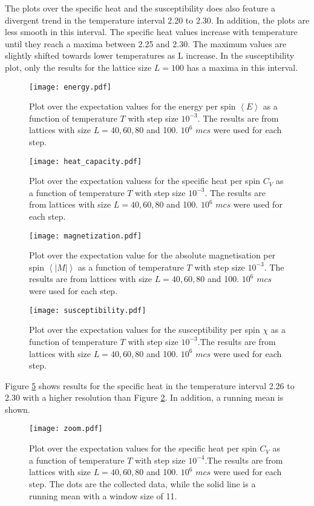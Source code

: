 The plots over the specific heat and the susceptibility does also feature a divergent trend in the temperature interval 2.20 to 2.30. In addition, the plots are less smooth in this interval. The specific heat values increase with temperature until they reach a maxima between 2.25 and 2.30. The maximum values are slightly shifted towards lower temperatures as L increase. In the susceptibility plot, only the results for the lattice size $L=100$ has a maxima in this interval.  
\begin{figure}[htbp]
	\centering
	\texttt{[image: energy.pdf]}
	\caption{Plot over the expectation values for the energy per spin $\left\langle E\right\rangle$ as a function of temperature $T$ with step size $10^{-3}$. The results are from lattices with size $L=40,60,80$ and 100.  $10^6$ $mcs$ were used for each step.}
	\label{fig:E}
\end{figure}

\begin{figure}[htbp]
	\centering
	\texttt{[image: heat\_capacity.pdf]}
	\caption{Plot over the expectation valuess for the specific heat per spin $C_V$ as a function of temperature $T$ with step size $10^{-3}$. The results are from lattices with size $L=40,60,80$ and 100. $10^6$ $mcs$ were used for each step.}
	\label{fig:C}
\end{figure}

\begin{figure}[htbp]
	\centering
	\texttt{[image: magnetization.pdf]}
	\caption{Plot over the expectation value for the absolute magnetisation per spin $\left\langle |M|\right\rangle$ as a function of temperature $T$ with step size $10^{-3}$. The results are from lattices with size $L=40,60,80$ and 100. $10^6$ $mcs$ were used for each step.}
	\label{fig:M}
\end{figure}

\begin{figure}[htbp]
	\centering
	\texttt{[image: susceptibility.pdf]}
	\caption{Plot over the expectation values for the susceptibility per spin $\chi$ as a function of temperature $T$ with step size $10^{-3}$.The results are from lattices with size $L=40,60,80$ and 100. $10^6$ $mcs$ were used for each step.}
	\label{fig:Chi}
\end{figure}

Figure \ref{fig:zoom} shows results for the specific heat in the temperature interval 2.26 to 2.30 with a higher resolution than Figure \ref{fig:C}. In addition, a running mean is shown.  
\begin{figure}[htbp]
	\centering
	\texttt{[image: zoom.pdf]}
	\caption{Plot over the expectation values for the specific heat per spin $C_V$ as a function of temperature $T$ with step size $10^{-4}$.The results are from lattices with size $L=40,60,80$ and 100. $10^6$ $mcs$ were used for each step. The dots are the collected data, while the solid line is a running mean with a window size of 11.}
	\label{fig:zoom}
\end{figure}

